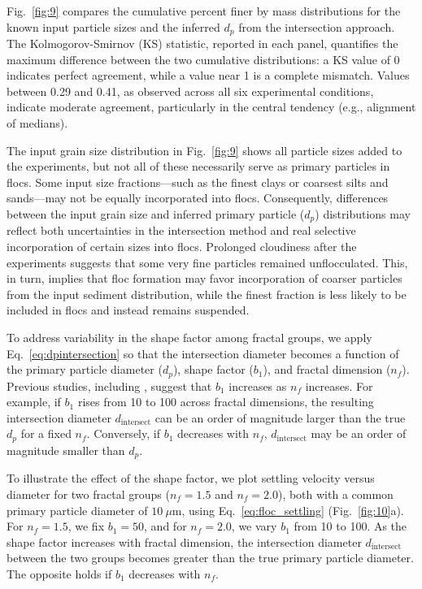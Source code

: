 \documentclass{agujournal2019}
\begin{document}
Fig.~\ref{fig:9} compares the cumulative percent finer by mass distributions for the known input particle sizes and the inferred $d_p$ from the intersection approach. The Kolmogorov-Smirnov (KS) statistic, reported in each panel, quantifies the maximum difference between the two cumulative distributions: a KS value of 0 indicates perfect agreement, while a value near 1 is a complete mismatch. Values between 0.29 and 0.41, as observed across all six experimental conditions, indicate moderate agreement, particularly in the central tendency (e.g., alignment of medians).

The input grain size distribution in Fig.~\ref{fig:9} shows all particle sizes added to the experiments, but not all of these necessarily serve as primary particles in flocs. Some input size fractions—such as the finest clays or coarsest silts and sands—may not be equally incorporated into flocs. Consequently, differences between the input grain size and inferred primary particle ($d_p$) distributions may reflect both uncertainties in the intersection method and real selective incorporation of certain sizes into flocs. Prolonged cloudiness after the experiments suggests that some very fine particles remained unflocculated. This, in turn, implies that floc formation may favor incorporation of coarser particles from the input sediment distribution, while the finest fraction is less likely to be included in flocs and instead remains suspended.

To address variability in the shape factor among fractal groups, we apply Eq.~\eqref{eq:dpintersection} so that the intersection diameter becomes a function of the primary particle diameter ($d_p$), shape factor ($b_1$), and fractal dimension ($n_f$). Previous studies, including , suggest that $b_1$ increases as $n_f$ increases. For example, if $b_1$ rises from 10 to 100 across fractal dimensions, the resulting intersection diameter $d_{\text{intersect}}$ can be an order of magnitude larger than the true $d_p$ for a fixed $n_f$. Conversely, if $b_1$ decreases with $n_f$, $d_{\text{intersect}}$ may be an order of magnitude smaller than $d_p$.

To illustrate the effect of the shape factor, we plot settling velocity versus diameter for two fractal groups ($n_f = 1.5$ and $n_f = 2.0$), both with a common primary particle diameter of $10~\mu$m, using Eq.~\eqref{eq:floc_settling} (Fig.~\ref{fig:10}a). For $n_f = 1.5$, we fix $b_1 = 50$, and for $n_f = 2.0$, we vary $b_1$ from 10 to 100. As the shape factor increases with fractal dimension, the intersection diameter $d_{\text{intersect}}$ between the two groups becomes greater than the true primary particle diameter. The opposite holds if $b_1$ decreases with $n_f$.
\end{document}
